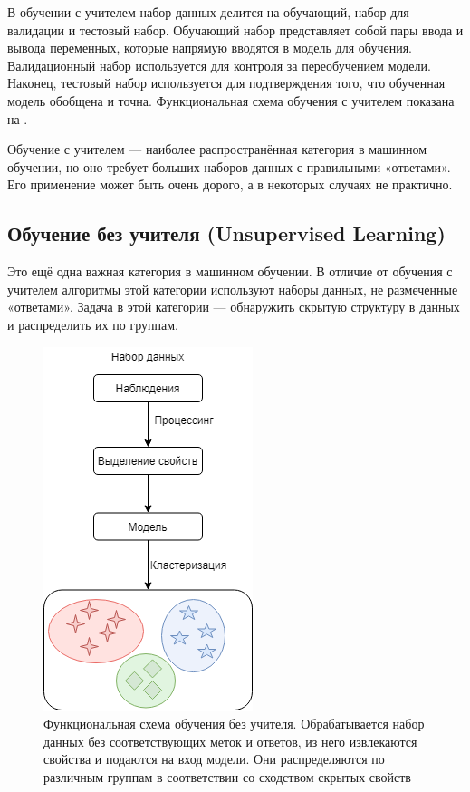 В обучении с учителем набор данных делится на обучающий, набор для валидации и тестовый набор. Обучающий набор представляет собой пары ввода и вывода переменных, которые напрямую вводятся в модель для обучения. Валидационный набор используется для контроля за переобучением модели. Наконец, тестовый набор используется для подтверждения того, что обученная модель обобщена и точна. Функциональная схема обучения с учителем показана на .

Обучение с учителем --- наиболее распространённая категория в машинном обучении, но оно требует больших наборов данных с правильными «ответами». Его применение может быть очень дорого, а в некоторых случаях не практично.

\subsection{Обучение без учителя (Unsupervised Learning)}

Это ещё одна важная категория в машинном обучении.
В отличие от обучения с учителем алгоритмы этой категории используют наборы данных, не размеченные «ответами». Задача в этой категории --- обнаружить скрытую структуру в данных и распределить их по группам.

\begin{figure}[ht!]
    \center
    \includegraphics [scale=0.60] {my_folder/images/ch1/unsupervised-learning.png}
    \caption{Функциональная схема обучения без учителя. Обрабатывается набор данных без соответствующих меток и ответов, из него извлекаются свойства и подаются на вход модели. Они распределяются по различным группам в соответствии со сходством скрытых свойств}
    \label{fig:unsupervised-learning}
\end{figure}

